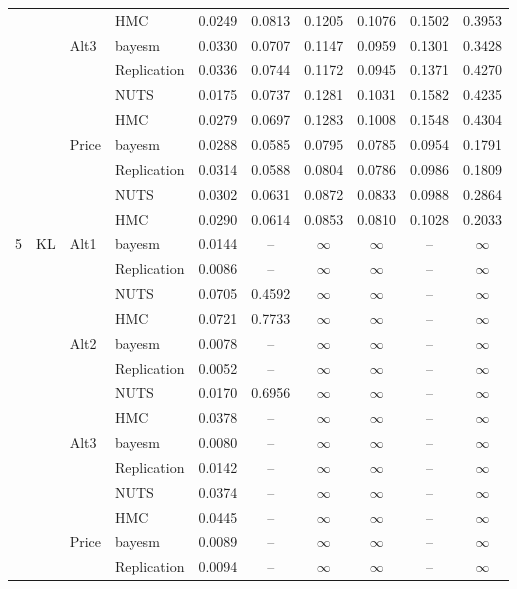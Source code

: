 \begin{longtable}{clllcccccc}
 &  &  & HMC & 0.0249 & 0.0813 & 0.1205 & 0.1076 & 0.1502 & 0.3953 \\
 &  & Alt3 & bayesm & 0.0330 & 0.0707 & 0.1147 & 0.0959 & 0.1301 & 0.3428 \\
 &  &  & Replication & 0.0336 & 0.0744 & 0.1172 & 0.0945 & 0.1371 & 0.4270 \\
 &  &  & NUTS & 0.0175 & 0.0737 & 0.1281 & 0.1031 & 0.1582 & 0.4235 \\
 &  &  & HMC & 0.0279 & 0.0697 & 0.1283 & 0.1008 & 0.1548 & 0.4304 \\
 &  & Price & bayesm & 0.0288 & 0.0585 & 0.0795 & 0.0785 & 0.0954 & 0.1791 \\
 &  &  & Replication & 0.0314 & 0.0588 & 0.0804 & 0.0786 & 0.0986 & 0.1809 \\
 &  &  & NUTS & 0.0302 & 0.0631 & 0.0872 & 0.0833 & 0.0988 & 0.2864 \\
 &  &  & HMC & 0.0290 & 0.0614 & 0.0853 & 0.0810 & 0.1028 & 0.2033 \\
5 & KL & Alt1 & bayesm & 0.0144 & {--} & $\infty$ & $\infty$ & {--} & $\infty$ \\
 &  &  & Replication & 0.0086 & {--} & $\infty$ & $\infty$ & {--} & $\infty$ \\
 &  &  & NUTS & 0.0705 & 0.4592 & $\infty$ & $\infty$ & {--} & $\infty$ \\
 &  &  & HMC & 0.0721 & 0.7733 & $\infty$ & $\infty$ & {--} & $\infty$ \\
 &  & Alt2 & bayesm & 0.0078 & {--} & $\infty$ & $\infty$ & {--} & $\infty$ \\
 &  &  & Replication & 0.0052 & {--} & $\infty$ & $\infty$ & {--} & $\infty$ \\
 &  &  & NUTS & 0.0170 & 0.6956 & $\infty$ & $\infty$ & {--} & $\infty$ \\
 &  &  & HMC & 0.0378 & {--} & $\infty$ & $\infty$ & {--} & $\infty$ \\
 &  & Alt3 & bayesm & 0.0080 & {--} & $\infty$ & $\infty$ & {--} & $\infty$ \\
 &  &  & Replication & 0.0142 & {--} & $\infty$ & $\infty$ & {--} & $\infty$ \\
 &  &  & NUTS & 0.0374 & {--} & $\infty$ & $\infty$ & {--} & $\infty$ \\
 &  &  & HMC & 0.0445 & {--} & $\infty$ & $\infty$ & {--} & $\infty$ \\
 &  & Price & bayesm & 0.0089 & {--} & $\infty$ & $\infty$ & {--} & $\infty$ \\
 &  &  & Replication & 0.0094 & {--} & $\infty$ & $\infty$ & {--} & $\infty$ \\

\end{longtable}
